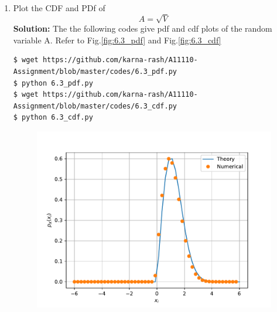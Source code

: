 \documentclass[journal,12pt,twocolumn]{IEEEtran}
\renewcommand\thesection{\arabic{section}}
\begin{document}
\begin{enumerate}[label=\thesection.\arabic*
,ref=\thesection.\theenumi]
\begin{align}
&=\int_{0}^{2\pi}\frac{r}{2\pi}e^{-\frac{r^2}{2}}d.\theta \\
&=2\pi.\frac{r}{2\pi}e^{-\frac{r^2}{2}} \\
&=re^{-\frac{r^2}{2}}
\end{align}
Now transform into Y:
\begin{align}
p_{Y}\brak{y}&=p_{R}\brak{r}.\frac{dr}{dy} \\
&=\sqrt{y}e^{-\frac{y}{2}}.\frac{1}{2\sqrt{y}} \\
&=\frac{e^{-\frac{y}{2}}}{2}
\end{align}
from pdf we can get cdf:\\
For $0 \le x \le 1$
\begin{align}
F_V\brak{x}&=\int_{0}^{x} \frac{e^{-\frac{u}{2}}}{2}du\\
&= 1-e^{-\frac{x}{2}} \\
\end{align}
\begin{equation}
F_V\brak{x}=\begin{cases}
1-e^{-\frac{x}{2}} & 0 \le x \le 1 \\
0  & x < 0  
\end{cases}
\end{equation}
So Thus confirmed that $\alpha = \frac{1}{2}$
\item
\label{ch3_raleigh_sim}
Plot the CDF and PDf of
%
\begin{equation}
A = \sqrt{V}
\end{equation}
\textbf{Solution:}
The the following codes give pdf and cdf plots of the random variable A. Refer to Fig.\ref{fig:6.3_pdf} and Fig.\ref{fig:6.3_cdf}
\begin{lstlisting}
$ wget https://github.com/karna-rash/A11110-Assignment/blob/master/codes/6.3_pdf.py
$ python 6.3_pdf.py
$ wget https://github.com/karna-rash/A11110-Assignment/blob/master/codes/6.3_cdf.py
$ python 6.3_cdf.py
	\end{lstlisting} 
	\begin{figure}
\centering
\includegraphics[width=\columnwidth]{./figs/sqrt_pdf}

\end{figure}
\end{enumerate}
\end{document}
